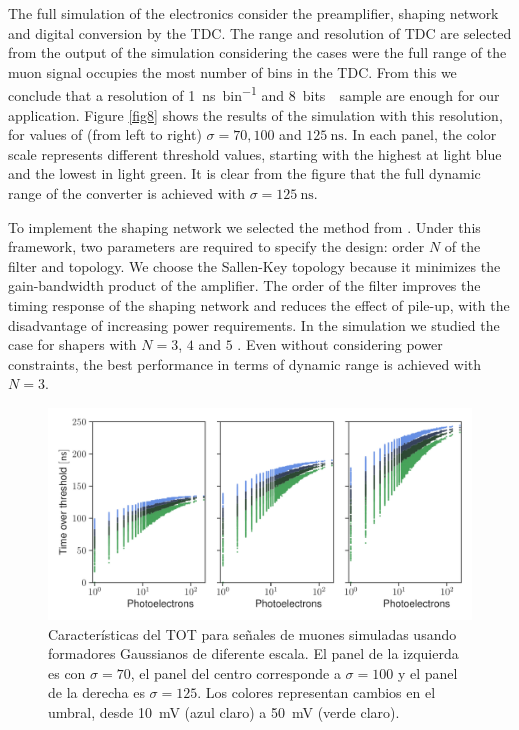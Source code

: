 The full simulation of the electronics consider the preamplifier, shaping network and digital conversion by the TDC. The range and resolution of TDC are selected from the output of the simulation considering the cases were the full range of the muon signal occupies the most number of bins in the TDC. From this we conclude that a resolution of \SI{1}{\ns\per bin} and \SI{8}{bits \per sample} are enough for our application. Figure \ref{fig8} shows the results of the simulation with this resolution, for values of (from left to right) $\sigma=70,100$ and $\SI{125}{\ns}$. In each panel, the color scale represents different threshold values, starting with the highest at light blue and the lowest in light green. It is clear from the figure that the full dynamic range of the converter is achieved with $\sigma=\SI{125}{\ns}$.

To implement the shaping network we selected the method from  \cite{ohkawa76}. Under this framework, two parameters are required to specify the design: order $N$ of the filter and topology. We choose the Sallen-Key topology because it minimizes the gain-bandwidth product of the amplifier. The order of the filter improves the timing response of the shaping network and reduces the effect of pile-up, with the disadvantage of increasing power requirements. In the simulation we studied the case for shapers with $N=3$, $4$ and $5$ . Even without considering power constraints, the best performance in terms of dynamic range is achieved with $N=3$.

\begin{figure}
        \centering
        \includegraphics[width=\textwidth]{tot_d30par.pdf}
        \caption{Características del TOT para señales de muones simuladas usando formadores Gaussianos de diferente escala. El panel de la izquierda es con $\sigma=70$, el panel del centro corresponde a $\sigma=100$ y el panel de la derecha es $\sigma=125$. Los colores representan cambios en el umbral, desde \SI{10}{\milli\volt} (azul claro) a \SI{50}{\milli\volt} (verde claro).}
        \label{fig:tot-sigma}
\end{figure}


